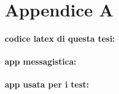 
\chapter*{Appendice A}

\subsubsection{codice latex di questa tesi:}


\subsubsection{app messagistica:}


\subsubsection{app usata per i test:}
